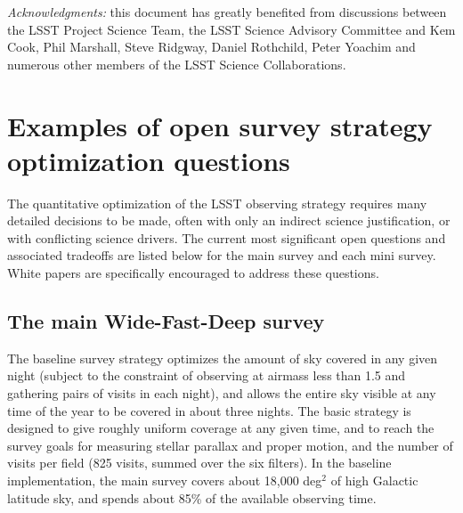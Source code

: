 \documentclass[DM,lsstdraft,toc,usenatbib]{lsstdoc}
\begin{document}
\vskip 0.2in 
{\it Acknowledgments:} this document has greatly benefited from discussions between 
the LSST Project Science Team, the LSST Science Advisory Committee and Kem Cook, 
Phil Marshall, Steve Ridgway, Daniel Rothchild, Peter Yoachim and numerous other members 
of the LSST Science Collaborations. 

\newpage
\appendix
\section{Examples of open survey strategy optimization questions} 

The quantitative optimization of the LSST observing strategy requires many 
detailed decisions to be made, often with only an indirect science justification,
or with conflicting science drivers.  The current most significant open questions and associated 
tradeoffs are listed below for the main survey and each mini survey. White papers are specifically 
encouraged to address these questions.


\subsection{The main Wide-Fast-Deep survey} 

The baseline survey strategy optimizes the amount of sky covered in any given night (subject to 
the constraint of observing at airmass less than 1.5 and gathering pairs of visits in each night), 
and allows the entire sky visible at any time of the year to be covered in about three nights. 
The basic strategy is designed to give roughly uniform coverage at any given time, and to reach
the survey goals for measuring stellar parallax and proper motion, and the number of visits per 
field (825 visits, summed over the six filters). In the baseline implementation, the main survey 
covers about 18,000 deg$^2$ of high Galactic latitude sky, and spends about 85\% of the available 
observing time. 
\end{document}
